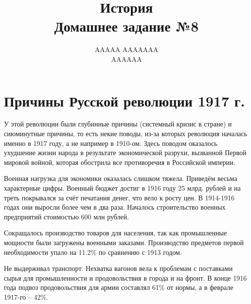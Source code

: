 \documentclass[12pt]{article}
\title{История \\ Домашнее задание №8}
\author{AAAAA AAAAAAA \\ AAAAAA}
\newcommand{\orange}[1]{{\color{orange}{#1}}}
\begin{document}
  \maketitle

  \setcounter{section}{2}
  \section{Причины Русской революции 1917 г.}

  У этой революции были глубинные причины (системный кризис в стране) и сиюминутные причины,
  то есть некие поводы, из-за которых революция началась именно в 1917 году, а не например в 1910-ом.
  Здесь поводом оказалось ухудшение жизни народа в результате экономической разрухи,
  вызванной Первой мировой войной, которая обострила все противоречия в Российской империи.

  Военная нагрузка для экономики оказалась слишком тяжела.
  Приведём весьма характерные цифры.
  Военный бюджет достиг в 1916 году 25 млрд. рублей и на треть покрывался за счёт печатания денег, что вело к росту цен.
  В 1914-1916 годах они выросли более чем в два раза.
  Началось строительство военных предприятий стоимостью 600 млн рублей.

  Сокращалось производство товаров для населения, так как промышленные мощности были загружены военными заказами.
  Производство предметов первой необходимости упало на 11.2\% по сравнению с 1913 годом.

  Не выдерживал транспорт.
  Нехватка вагонов вела к проблемам с поставками сырья для промышленности и продовольствия в города и на фронт.
  В конце 1916 года подвоз продовольствия для армии составлял 61\% от нормы, а в феврале 1917-го -- 42\%.

\end{document}
